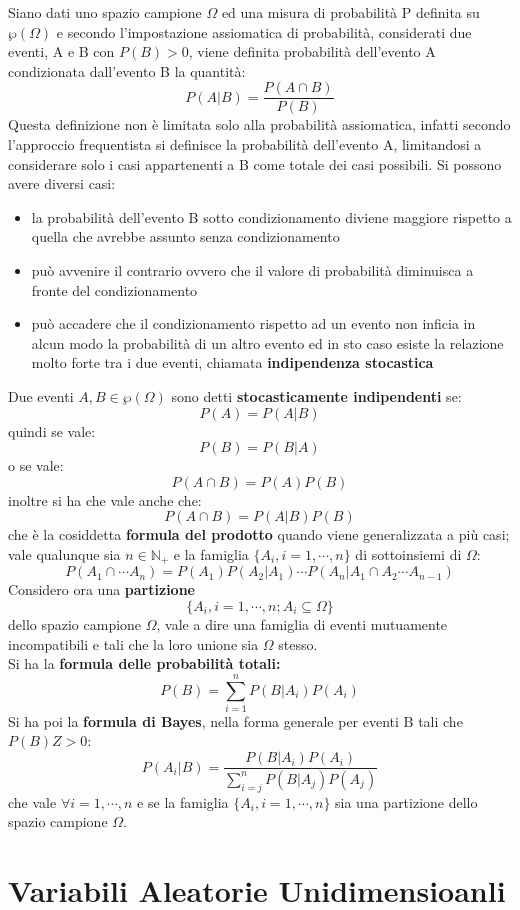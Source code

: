 \documentclass[a4paper,12pt, oneside]{book}
\begin{document}
Siano dati uno spazio campione $\Omega$ ed una misura di probabilità P definita su $\wp(\Omega)$ e
secondo l'impostazione assiomatica di probabilità, considerati due eventi, A e B con $P(B)>0$,
viene definita  probabilità dell'evento A condizionata dall'evento B la quantità:
\[P(A|B) = \frac{P(A\cap B)}{P(B)} \]
Questa definizione non è limitata solo alla probabilità assiomatica, infatti secondo l'approccio frequentista 
si definisce la probabilità dell'evento A, limitandosi a considerare solo i casi appartenenti a B come totale dei casi possibili.
Si possono avere diversi casi:
\begin{itemize}
\item la probabilità dell’evento B sotto condizionamento diviene maggiore rispetto a quella che avrebbe assunto senza condizionamento
    \item può avvenire il contrario ovvero che il valore di probabilità diminuisca a fronte del condizionamento
    \item può accadere che il condizionamento rispetto ad un evento non inficia in alcun modo la probabilità di 
          un altro evento ed in sto caso esiste la relazione molto forte tra i due eventi, chiamata \textbf{indipendenza stocastica}
\end{itemize}
Due eventi $A,B\in\wp(\Omega)$ sono detti \textbf{stocasticamente indipendenti} se:
\[P(A)=P(A|B)\]
quindi se vale:
\[P(B)=P(B|A)\]
o se vale:
\[P(A\cap B)=P(A)P(B)\]
inoltre si ha che vale anche che:
\[P(A\cap B)=P(A|B)P(B)\]
che è la cosiddetta \textbf{formula del prodotto} quando viene generalizzata a più casi; vale qualunque sia $n\in \mathbb{N}_+$ e la famiglia $\{A_i,i=1,\cdots, n\}$ di sottoinsiemi di $\Omega$:
\[P(A_1\cap\cdots A_n)=P(A_1)P(A_2|A_1)\cdots P(A_n|A_1\cap A_2\cdots A_{n-1})\]
Considero ora una \textbf{partizione} 
\[\{A_i, i=1,\cdots,n;A_i\subseteq \Omega\}\]
dello spazio campione $\Omega$, vale a dire una famiglia di eventi mutuamente incompatibili e
tali che la loro unione sia $\Omega$ stesso. \\
Si ha la \textbf{formula delle probabilità totali:}
\[P(B)=\sum_{i=1}^n P(B|A_i)P(A_i)\]
Si ha poi la \textbf{formula di Bayes}, nella forma generale per eventi B tali che $P(B)Z>0$:
\[P(A_i|B)=\frac{P(B|A_i)P(A_i)}{\sum_{i=j}^n P(B|A_j)P(A_j)}\]
che vale $\forall i=1,\cdots, n$ e se la famiglia $\{A_i,i=1,\cdots, n\}$ sia una partizione dello spazio campione $\Omega$.
\section{Variabili Aleatorie Unidimensioanli}
\end{document}
